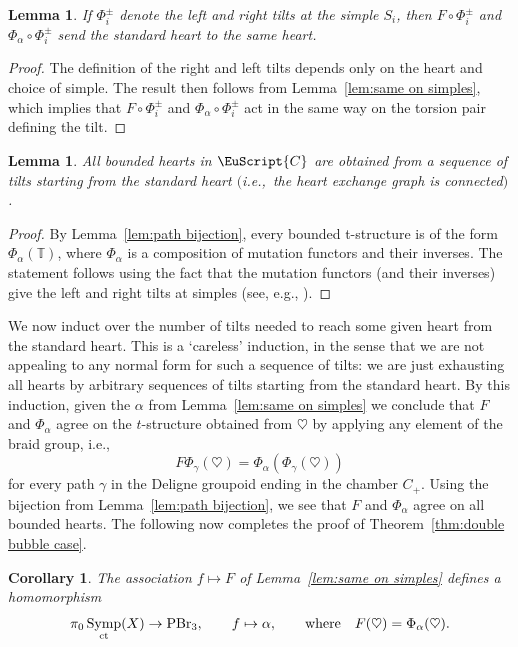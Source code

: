 \documentclass[10pt,a4paper]{amsart}
\newcommand{\scrC}{\EuScript{C}}
\DeclareMathOperator{\Symp}{Symp}
\def\bT{\mathbb{T}}
\newtheorem{lem}[thm]{Lemma}
\newtheorem{cor}[thm]{Corollary}
\theoremstyle{definition}
\numberwithin{equation}{section}
\begin{document}
\begin{lem}
If $\Phi_i^{\pm}$ denote the left and right tilts at the simple $S_i$, then $F \circ \Phi_i^{\pm}$ and $\Phi_{\alpha} \circ \Phi_i^{\pm}$ send the standard heart to the same heart.
\end{lem}

\begin{proof}
The definition of the right and left tilts depends only on the heart and choice of simple. The result then follows from Lemma~\ref{lem:same on simples}, which implies that $F \circ \Phi_i^{\pm}$ and $\Phi_{\alpha} \circ \Phi_i^{\pm}$ act in the same way on the torsion pair defining the tilt.
\end{proof}

\begin{lem}
All bounded hearts in $\scrC$ are obtained from a sequence of tilts starting from the standard heart $($i.e.,~the heart exchange graph is connected$)$.
\end{lem}

\begin{proof}
By Lemma~\ref{lem:path bijection}, every bounded t-structure is of the form $\Phi_{\alpha}(\bT)$, where $\Phi_{\alpha}$ is a composition of mutation functors and their inverses. The statement follows using the fact that the mutation functors (and their inverses) give the left and right tilts at simples (see, e.g., \cite[Lemma~5.5]{Hirano-Wemyss}).
\end{proof}

We now induct over the number of tilts needed to reach some given heart from the standard heart. This is a `careless' induction, in the sense that we are not appealing to any normal form for such a sequence of tilts: we are just exhausting all hearts by arbitrary sequences of tilts starting from the standard heart. By this induction, given the $\alpha$ from Lemma~\ref{lem:same on simples} we conclude that $F$ and $\Phi_{\alpha}$ agree on the $t$-structure obtained from $\heartsuit$ by applying any element of the braid group, i.e.,
\[
F \Phi_{\gamma}(\heartsuit) = \Phi_{\alpha}(\Phi_{\gamma}(\heartsuit))
\]
for every path $\gamma$ in the Deligne groupoid ending in the chamber $C_+$. Using the bijection from Lemma~\ref{lem:path bijection}, we see that $F$ and $\Phi_{\alpha}$ agree on all bounded hearts. The following now completes the proof of Theorem~\ref{thm:double bubble case}.

 \begin{cor}
 The association $f \mapsto F$ of Lemma~{\rm \ref{lem:same on simples}} defines a homomorphism
 \[
 \pi_0\Symp_{\rm ct}(X) \to {\rm PBr}_3, \qquad f \mapsto \alpha, \qquad \mathrm{where} \quad F(\heartsuit) = \Phi_{\alpha}(\heartsuit).
 \]
 \end{cor}
\end{document}
